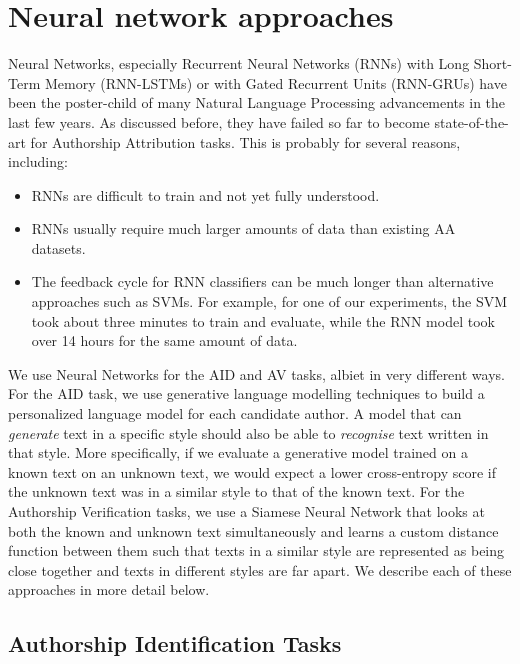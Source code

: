 \section{Neural network approaches}
\label{method:nn}

Neural Networks, especially Recurrent Neural Networks (RNNs) with Long Short-Term Memory (RNN-LSTMs) or with Gated Recurrent Units (RNN-GRUs) have been the poster-child of many Natural Language Processing advancements in the last few years. As discussed before, they have failed so far to become state-of-the-art for Authorship Attribution tasks. This is probably for several reasons, including:

\begin{itemize}
\tightlist
\item
  RNNs are difficult to train and not yet fully understood.
\item
  RNNs usually require much larger amounts of data than existing AA datasets.
\item
  The feedback cycle for RNN classifiers can be much longer than alternative approaches such as SVMs. For example, for one of our experiments, the SVM took about three minutes to train and evaluate, while the RNN model took over 14 hours for the same amount of data.
\end{itemize}

We use Neural Networks for the AID and AV tasks, albiet in very different ways. For the AID task, we use generative language modelling techniques to build a personalized language model for each candidate author. A model that can \textit{generate} text in a specific style should also be able to \textit{recognise} text written in that style. More specifically, if we evaluate a generative model trained on a known text on an unknown text, we would expect a lower cross-entropy score if the unknown text was in a similar style to that of the known text. For the Authorship Verification tasks, we use a Siamese Neural Network that looks at both the known and unknown text simultaneously and learns a custom distance function between them such that texts in a similar style are represented as being close together and texts in different styles are far apart. We describe each of these approaches in more detail below. 


\subsection{Authorship Identification Tasks}
\label{method:nn-aid}

